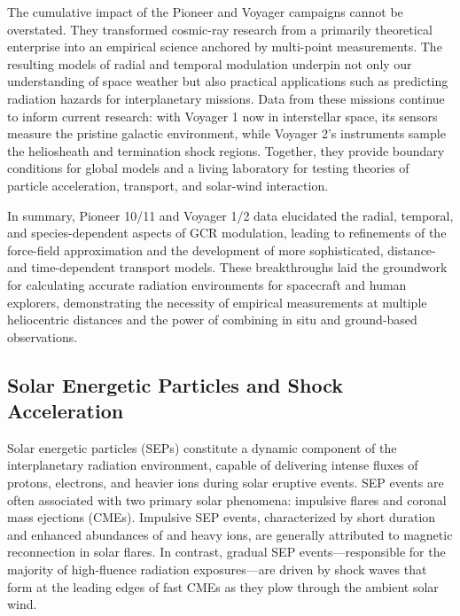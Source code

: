 \documentclass[12pt]{report}
\begin{document}
The cumulative impact of the Pioneer and Voyager campaigns cannot be overstated. They transformed cosmic-ray research from a primarily theoretical enterprise into an empirical science anchored by multi-point measurements. The resulting models of radial and temporal modulation underpin not only our understanding of space weather but also practical applications such as predicting radiation hazards for interplanetary missions. Data from these missions continue to inform current research: with Voyager 1 now in interstellar space, its sensors measure the pristine galactic environment, while Voyager 2’s instruments sample the heliosheath and termination shock regions. Together, they provide boundary conditions for global models and a living laboratory for testing theories of particle acceleration, transport, and solar-wind interaction.

In summary, Pioneer 10/11 and Voyager 1/2 data elucidated the radial, temporal, and species-dependent aspects of GCR modulation, leading to refinements of the force-field approximation and the development of more sophisticated, distance- and time-dependent transport models. These breakthroughs laid the groundwork for calculating accurate radiation environments for spacecraft and human explorers, demonstrating the necessity of empirical measurements at multiple heliocentric distances and the power of combining in situ and ground-based observations.  


\subsection{Solar Energetic Particles and Shock Acceleration}
Solar energetic particles (SEPs) constitute a dynamic component of the interplanetary radiation environment, capable of delivering intense fluxes of protons, electrons, and heavier ions during solar eruptive events.  SEP events are often associated with two primary solar phenomena: impulsive flares and coronal mass ejections (CMEs).  Impulsive SEP events, characterized by short duration and enhanced abundances of  and heavy ions, are generally attributed to magnetic reconnection in solar flares.  In contrast, gradual SEP events—responsible for the majority of high‐fluence radiation exposures—are driven by shock waves that form at the leading edges of fast CMEs as they plow through the ambient solar wind.
\end{document}
